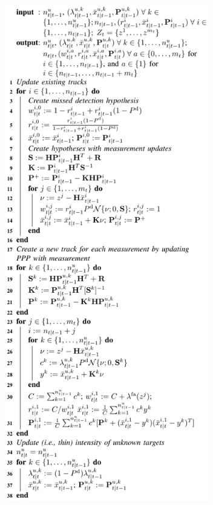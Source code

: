 \documentclass[journal,twoside]{IEEEtran}
\theoremstyle{plain}
\begin{document}
\begin{figure}
\ifCLASSOPTIONdraftcls
\includegraphics[width=3.5in]{figure8.pdf}
\else

\end{figure}
\end{document}
